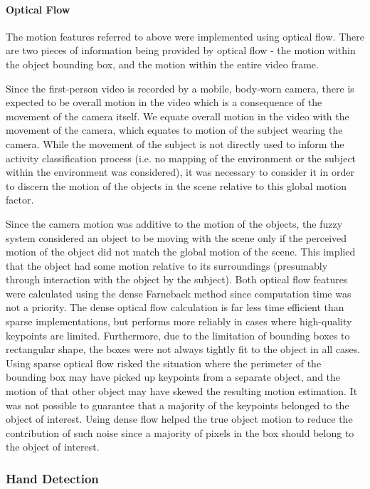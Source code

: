 \documentclass[12pt]{report}
\begin{document}
\paragraph{Optical Flow}
The motion features referred to above were implemented using optical flow. There are two pieces of information being provided by optical flow - the motion within the object bounding box, and the motion within the entire video frame.

Since the first-person video is recorded by a mobile, body-worn camera, there is expected to be overall motion in the video which is a consequence of the movement of the camera itself. We equate overall motion in the video with the movement of the camera, which equates to motion of the subject wearing the camera. While the movement of the subject is not directly used to inform the activity classification process (i.e. no mapping of the environment or the subject within the environment was considered), it was necessary to consider it in order to discern the motion of the objects in the scene relative to this global motion factor.

Since the camera motion was additive to the motion of the objects, the fuzzy system considered an object to be moving with the scene only if the perceived motion of the object did not match the global motion of the scene. This implied that the object had some motion relative to its surroundings (presumably through interaction with the object by the subject). Both optical flow features were calculated using the dense Farneback method \cite{Farneback2003Two-FrameOn} since computation time was not a priority. The dense optical flow calculation is far less time efficient than sparse implementations, but performs more reliably in cases where high-quality keypoints are limited. Furthermore, due to the limitation of bounding boxes to rectangular shape, the boxes were not always tightly fit to the object in all cases. Using sparse optical flow risked the situation where the perimeter of the bounding box may have picked up keypoints from a separate object, and the motion of that other object may have skewed the resulting motion estimation. It was not possible to guarantee that a majority of the keypoints belonged to the object of interest. Using dense flow helped the true object motion to reduce the contribution of such noise since a majority of pixels in the box should belong to the object of interest.

\subsubsection{Hand Detection}
\end{document}
